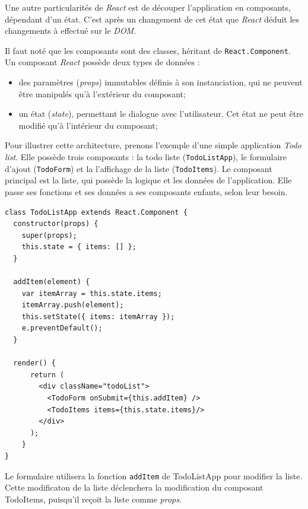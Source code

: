 \bigskip

Une autre particularités de \emph{React} est de découper l'application
en composants, dépendant d'un état. C'est après un changement de cet
état que \emph{React} déduit les changements à effectué sur le
\emph{DOM}.

\bigskip

Il faut noté que les composants sont des classes, héritant de
\texttt{React.Component}. Un composant \emph{React} possède deux types
de données :

\begin{itemize}
\tightlist
\item
  des paramètres (\emph{props}) immutables définis à son instanciation,
  qui ne peuvent être manipulés qu'à l'extérieur du composant;
\item
  un état (\emph{state}), permettant le dialogue avec l'utilisateur. Cet
  état ne peut être modifié qu'à l'intérieur du composant;
\end{itemize}

\bigskip

Pour illustrer cette architecture, prenons l'exemple d'une simple
application \emph{Todo list}. Elle possède trois composants : la todo
liste (\texttt{TodoListApp}), le formulaire d'ajout (\texttt{TodoForm})
et la l'affichage de la liste (\texttt{TodoItems}). Le composant
principal est la liste, qui possède la logique et les données de
l'application. Elle passe ses fonctions et ses données a ses composants
enfants, selon leur besoin.

\begin{verbatim}
class TodoListApp extends React.Component {
  constructor(props) {
    super(props);
    this.state = { items: [] };
  }

  addItem(element) {
    var itemArray = this.state.items;
    itemArray.push(element);
    this.setState({ items: itemArray });
    e.preventDefault();
  }

  render() {
      return (
        <div className="todoList">
          <TodoForm onSubmit={this.addItem} />
          <TodoItems items={this.state.items}/>
        </div>
      );
    }
}
\end{verbatim}

Le formulaire utilisera la fonction \texttt{addItem} de TodoListApp pour
modifier la liste. Cette modificaton de la liste déclenchera la
modification du composant TodoItems, puisqu'il reçoit la liste comme
\emph{props}.

\bigskip

